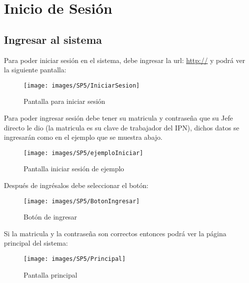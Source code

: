 \chapter{Inicio de Sesión}
    
    \section{Ingresar al sistema}
        Para poder iniciar sesión en el sistema, debe ingresar la url: \url{http://} y podrá ver la siguiente pantalla:
        
        \begin{figure}[!hbtp]
            \centering
            \hypertarget{iniciarS}{\texttt{[image: images/SP5/IniciarSesion]}}
            \caption{Pantalla para iniciar sesión}
        \end{figure}
        
        Para poder ingresar sesión debe tener su matricula y contraseña que su Jefe directo le dio (la matricula es su clave de trabajador del IPN), dichos datos se ingresarán como en el ejemplo que se muestra abajo.
        
        \begin{figure}[!hbtp]
            \centering
            \hypertarget{iniciarL}{\texttt{[image: images/SP5/ejemploIniciar]}}
            \caption{Pantalla iniciar sesión de ejemplo}
        \end{figure}
        
        Después de ingrésalos debe seleccionar el botón:
        
        \begin{figure}[!hbtp]
            \centering
            \hypertarget{BotonIng}{\texttt{[image: images/SP5/BotonIngresar]}}
            \caption{Botón de ingresar}
            \label{consultarrh}
        \end{figure}
        
        Si la matricula y la contraseña son correctos entonces podrá ver la página principal del sistema:
    
        \begin{figure}[!hbtp]
            \centering
            \hypertarget{Principal}{\texttt{[image: images/SP5/Principal]}}
            \caption{Pantalla principal}
        \end{figure}
        
